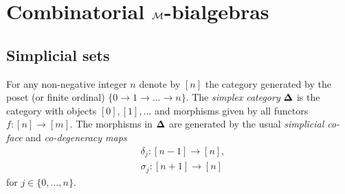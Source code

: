 \section{Combinatorial $\mathcal{M}$-bialgebras}


\subsection{Simplicial sets}

For any non-negative integer $n$ denote by $[n]$ the category generated by the poset (or finite ordinal) $\{0 \to 1 \to \dots \to n\}$.
The \textit{simplex category} $\mathbf{\Delta}$ is the category with objects $[0], [1], \dots$ and morphisms given by all functors $f \colon [n] \to [m]$.
The morphisms in $\mathbf{\Delta}$ are generated by the usual
\textit{simplicial co-face} and \textit{co-degeneracy maps}
\begin{align*}
& \delta_j \colon [n-1] \to [n], \\
& \sigma_j \colon [n+1] \to [n]
\end{align*}
for $j \in \{0, \dots, n\}$.

%


